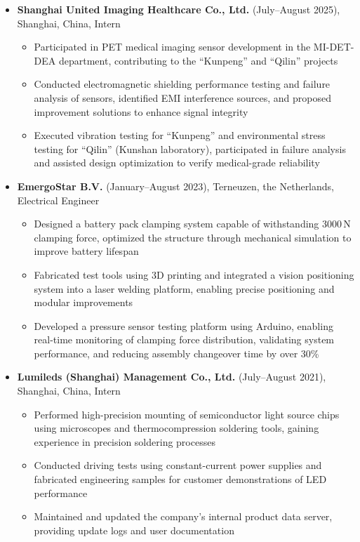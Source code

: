 \documentclass[11pt]{article}
\begin{document}
    \begin{itemize}
    \item \textbf{Shanghai United Imaging Healthcare Co., Ltd.} (July--August 2025), Shanghai, China, Intern
    \begin{itemize}
    \item Participated in PET medical imaging sensor development in the MI-DET-DEA department, contributing to the ``Kunpeng'' and ``Qilin'' projects
    \item Conducted electromagnetic shielding performance testing and failure analysis of sensors, identified EMI interference sources, and proposed improvement solutions to enhance signal integrity
    \item Executed vibration testing for ``Kunpeng'' and environmental stress testing for ``Qilin'' (Kunshan laboratory), participated in failure analysis and assisted design optimization to verify medical-grade reliability
    \end{itemize}

	\item \textbf{EmergoStar B.V.} (January--August 2023), Terneuzen, the Netherlands, Electrical Engineer
    \begin{itemize}
    \item Designed a battery pack clamping system capable of withstanding 3000\,N clamping force, optimized the structure through mechanical simulation to improve battery lifespan
    \item Fabricated test tools using 3D printing and integrated a vision positioning system into a laser welding platform, enabling precise positioning and modular improvements
    \item Developed a pressure sensor testing platform using Arduino, enabling real-time monitoring of clamping force distribution, validating system performance, and reducing assembly changeover time by over 30\%
\end{itemize}
	\item \textbf{Lumileds (Shanghai) Management Co., Ltd.} (July--August 2021), Shanghai, China, Intern
    \begin{itemize}
    \item Performed high-precision mounting of semiconductor light source chips using microscopes and thermocompression soldering tools, gaining experience in precision soldering processes
    \item Conducted driving tests using constant-current power supplies and fabricated engineering samples for customer demonstrations of LED performance
    \item Maintained and updated the company’s internal product data server, providing update logs and user documentation
    \end{itemize}
\end{itemize}
\end{document}
